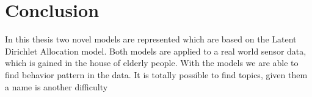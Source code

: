 \documentclass[a4paper,fleqn]{article}
\begin{document}
\section{Conclusion}
\label{sec:Conc}
In this thesis two novel models are represented which are based on the Latent Dirichlet Allocation model. Both models are applied to a real world sensor data, which is gained in the house of elderly people. With the models we are able to find behavior pattern in the data.
It is totally possible to find topics, given them a name is another difficulty


\appendix

{}

\end{document}

